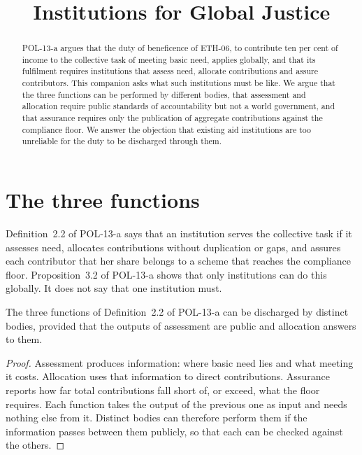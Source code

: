 \documentclass{situationist-preprint}
\title{Institutions for Global Justice}
\begin{document}
\maketitle

\begin{abstract}
POL-13-a argues that the duty of beneficence of ETH-06, to contribute ten per cent of income to the collective task of meeting basic need, applies globally, and that its fulfilment requires institutions that assess need, allocate contributions and assure contributors. This companion asks what such institutions must be like. We argue that the three functions can be performed by different bodies, that assessment and allocation require public standards of accountability but not a world government, and that assurance requires only the publication of aggregate contributions against the compliance floor. We answer the objection that existing aid institutions are too unreliable for the duty to be discharged through them.
\end{abstract}

\section{The three functions}

Definition~2.2 of POL-13-a says that an institution serves the collective task if it assesses need, allocates contributions without duplication or gaps, and assures each contributor that her share belongs to a scheme that reaches the compliance floor. Proposition~3.2 of POL-13-a shows that only institutions can do this globally. It does not say that one institution must.

\begin{proposition}\label{p:division}
The three functions of Definition~2.2 of POL-13-a can be discharged by distinct bodies, provided that the outputs of assessment are public and allocation answers to them.
\end{proposition}

\begin{proof}
Assessment produces information: where basic need lies and what meeting it costs. Allocation uses that information to direct contributions. Assurance reports how far total contributions fall short of, or exceed, what the floor requires. Each function takes the output of the previous one as input and needs nothing else from it. Distinct bodies can therefore perform them if the information passes between them publicly, so that each can be checked against the others.
\end{proof}
\end{document}
